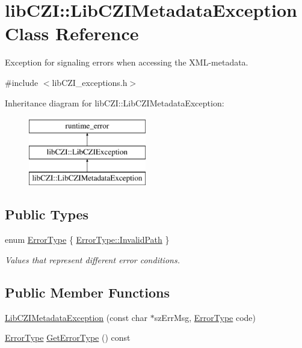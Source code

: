\hypertarget{classlib_c_z_i_1_1_lib_c_z_i_metadata_exception}{}\section{lib\+C\+ZI\+:\+:Lib\+C\+Z\+I\+Metadata\+Exception Class Reference}
\label{classlib_c_z_i_1_1_lib_c_z_i_metadata_exception}


Exception for signaling errors when accessing the X\+M\+L-\/metadata.  




{\ttfamily \#include $<$lib\+C\+Z\+I\+\_\+exceptions.\+h$>$}

Inheritance diagram for lib\+C\+ZI\+:\+:Lib\+C\+Z\+I\+Metadata\+Exception\+:\begin{figure}[H]
\begin{center}
\leavevmode
\includegraphics[height=3.000000cm]{classlib_c_z_i_1_1_lib_c_z_i_metadata_exception}
\end{center}
\end{figure}
\subsection*{Public Types}
\begin{DoxyCompactItemize}
\item 
enum \hyperlink{classlib_c_z_i_1_1_lib_c_z_i_metadata_exception_a60fe07e00ad32f331a85aafedec72242}{Error\+Type} \{ \hyperlink{classlib_c_z_i_1_1_lib_c_z_i_metadata_exception_a60fe07e00ad32f331a85aafedec72242a5d0744802b24f44a161d350c25d76c7b}{Error\+Type\+::\+Invalid\+Path}
 \}\begin{DoxyCompactList}\small\item\em Values that represent different error conditions. \end{DoxyCompactList}
\end{DoxyCompactItemize}
\subsection*{Public Member Functions}
\begin{DoxyCompactItemize}
\item 
\hyperlink{classlib_c_z_i_1_1_lib_c_z_i_metadata_exception_aa424dbc90e0fd24bc94da6a1021d3606}{Lib\+C\+Z\+I\+Metadata\+Exception} (const char $\ast$sz\+Err\+Msg, \hyperlink{classlib_c_z_i_1_1_lib_c_z_i_metadata_exception_a60fe07e00ad32f331a85aafedec72242}{Error\+Type} code)
\item 
\hyperlink{classlib_c_z_i_1_1_lib_c_z_i_metadata_exception_a60fe07e00ad32f331a85aafedec72242}{Error\+Type} \hyperlink{classlib_c_z_i_1_1_lib_c_z_i_metadata_exception_a0ea32f2d1a6b8a868617209a2984b167}{Get\+Error\+Type} () const
\end{DoxyCompactItemize}


